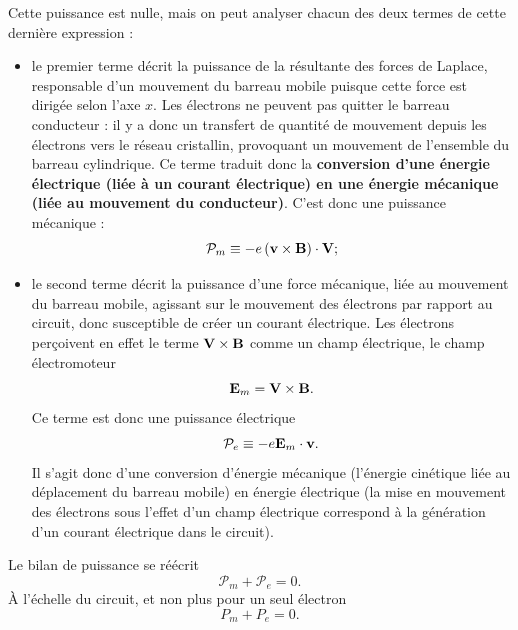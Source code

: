 \documentclass[11pt,a4paper]{report}
\begin{document}
Cette puissance est nulle, mais on peut analyser chacun des deux termes de cette dernière expression :
\begin{itemize}
	\item le premier terme décrit la puissance de la résultante des forces de Laplace, responsable d'un 	mouvement du barreau mobile puisque cette force est dirigée selon l'axe $x$. Les électrons ne 			peuvent pas quitter le barreau conducteur : il y a donc un transfert de quantité de mouvement 			depuis les électrons vers le réseau cristallin, provoquant un mouvement de l'ensemble du barreau 		cylindrique. Ce terme traduit donc la \textbf{conversion d'une énergie électrique (liée à un 			courant électrique) en une énergie mécanique (liée au mouvement du conducteur)}. C'est donc une 		puissance mécanique :
	\begin{equation}
		\mathcal{P}_m \equiv -e\left(\bold{v}\times\bold{B}\right)\cdot\bold{V}; 
	\end{equation}
	
	\item le second terme décrit la puissance d'une force mécanique, liée au mouvement du barreau 			mobile, agissant sur le mouvement des électrons par rapport au circuit, donc susceptible de créer 		un courant électrique. Les électrons perçoivent en effet le terme $\bold{V}\times\bold{B}$ comme un 	champ électrique, le champ électromoteur
	\begin{equation}
		\bold{E}_m = \bold{V}\times\bold{B}.
	\end{equation}
	Ce terme est donc une puissance électrique
	\begin{equation}
		\mathcal{P}_e \equiv -e\bold{E}_m\cdot\bold{v}.
	\end{equation}
	Il s'agit donc d'une conversion d'énergie mécanique (l'énergie cinétique liée au déplacement du 		barreau mobile) en énergie électrique (la mise en mouvement des électrons sous l'effet d'un champ 		électrique correspond à la génération d'un courant électrique dans le circuit).\\
\end{itemize}

Le bilan de puissance se réécrit
\begin{equation}
	\boxed{\mathcal{P}_m + \mathcal{P}_e = 0}.
\end{equation}
\`A l'échelle du circuit, et non plus pour un seul électron
\begin{equation}
	\boxed{P_m + P_e = 0}.
\end{equation}
\end{document}
